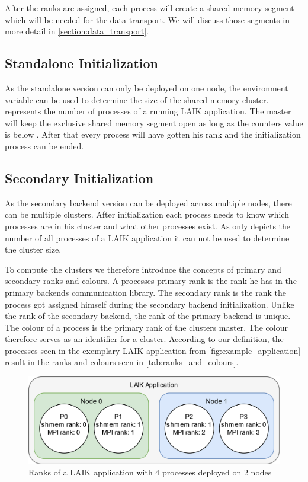 After the ranks are assigned, each process will create a shared memory segment which will be needed for the data transport.
We will discuss those segments in more detail in \autoref{section:data_transport}.

\subsection{Standalone Initialization}

As the standalone version can only be deployed on one node, the environment variable  can be used to determine the size of the shared memory cluster.
 represents the number of processes of a running LAIK application.
The master will keep the exclusive shared memory segment open as long as the counters value is below .
After that every process will have gotten his rank and the initialization process can be ended.

\subsection{Secondary Initialization}\label{section:secondary_initialization}

As the secondary backend version can be deployed across multiple nodes, there can be multiple clusters.
After initialization each process needs to know which processes are in his cluster and what other processes exist.
As  only depicts the number of all processes of a LAIK application it can not be used to determine the cluster size.

To compute the clusters we therefore introduce the concepts of primary and secondary ranks and colours.
A processes primary rank is the rank he has in the primary backends communication library.
The secondary rank is the rank the process got assigned himself during the secondary backend initialization.
Unlike the rank of the secondary backend, the rank of the primary backend is unique.
The colour of a process is the primary rank of the clusters master.
The colour therefore serves as an identifier for a cluster.
According to our definition, the processes seen in the exemplary LAIK application from \autoref{fig:example_application} result in the ranks and colours seen in \autoref{tab:ranks_and_colours}.

\begin{figure}[h]
	\centering
	\includegraphics[width=0.66\columnwidth]{figures/example_application.png}
	\caption{Ranks of a LAIK application with 4 processes deployed on 2 nodes}
	\label{fig:example_application}
\end{figure}

